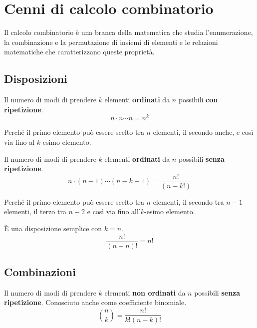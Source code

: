 %
%
%
%
\chapter{Cenni di calcolo combinatorio}
Il calcolo combinatorio è una branca della matematica che studia l'enumerazione, la combinazione e la permutazione di insiemi di elementi e le relazioni matematiche che caratterizzano queste proprietà.
\section{Disposizioni}
\begin{definition}
  Il numero di modi di prendere $k$ elementi \textbf{ordinati} da $n$ possibili \textbf{con ripetizione}.
  \[
  n \cdot n \cdots n = n^k
  \]
\end{definition}
Perché il primo elemento può essere scelto tra $n$ elementi, il secondo anche, e così via fino al $k$-esimo elemento.

\begin{definition}\label{def:disposizione_semplice}
  Il numero di modi di prendere $k$ elementi \textbf{ordinati} da $n$ possibili \textbf{senza ripetizione}.
  \[
  n \cdot (n - 1) \cdots (n - k + 1) = \frac{n!}{(n-k!)}
  \]
\end{definition}
Perché il primo elemento può essere scelto tra $n$ elementi, il secondo tra $n - 1$ elementi, il terzo tra $n - 2$ e così via fino all'$k$-esimo elemento.

\begin{definition}[Permutazione]
  È una disposizione semplice con $k = n$.
  \[
  \frac{n!}{(n - n)!} = n!
  \]
\end{definition}

\section{Combinazioni}
\begin{definition}
  Il numero di modi di prendere $k$ elementi \textbf{non ordinati} da $n$ possibili \textbf{senza ripetizione}. Conosciuto anche come coefficiente binomiale.
  \[
  \binom{n}{k} = \frac{n!}{k!(n-k)!}
  \]
\end{definition}

